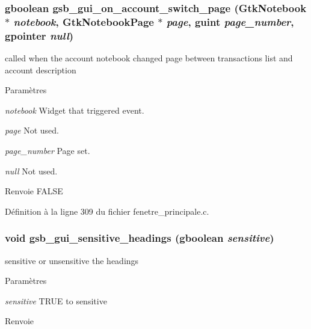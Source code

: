 \subsubsection[{gsb\_\-gui\_\-on\_\-account\_\-switch\_\-page}]{\setlength{\rightskip}{0pt plus 5cm}gboolean gsb\_\-gui\_\-on\_\-account\_\-switch\_\-page (GtkNotebook $\ast$ {\em notebook}, \/  GtkNotebookPage $\ast$ {\em page}, \/  guint {\em page\_\-number}, \/  gpointer {\em null})}\label{fenetre__principale_8c_ac472c4356247af478d93db80f99a2792}
called when the account notebook changed page between transactions list and account description


\begin{DoxyParams}{Paramètres}
\item[{\em notebook}]Widget that triggered event. \item[{\em page}]Not used. \item[{\em page\_\-number}]Page set. \item[{\em null}]Not used.\end{DoxyParams}
\begin{DoxyReturn}{Renvoie}
FALSE 
\end{DoxyReturn}


Définition à la ligne 309 du fichier fenetre\_\-principale.c.

\subsubsection[{gsb\_\-gui\_\-sensitive\_\-headings}]{\setlength{\rightskip}{0pt plus 5cm}void gsb\_\-gui\_\-sensitive\_\-headings (gboolean {\em sensitive})}\label{fenetre__principale_8c_a94542c45fb71a3cd8b955b5e0fcc2ed9}
sensitive or unsensitive the headings


\begin{DoxyParams}{Paramètres}
\item[{\em sensitive}]TRUE to sensitive\end{DoxyParams}
\begin{DoxyReturn}{Renvoie}

\end{DoxyReturn}


